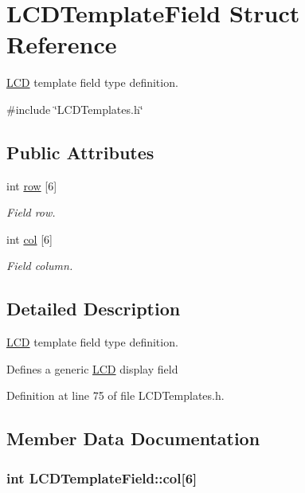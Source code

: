\hypertarget{struct_l_c_d_template_field}{\section{L\-C\-D\-Template\-Field Struct Reference}
\label{struct_l_c_d_template_field}
}


\hyperlink{class_l_c_d}{L\-C\-D} template field type definition.  




{\ttfamily \#include \char`\"{}L\-C\-D\-Templates.\-h\char`\"{}}

\subsection*{Public Attributes}
\begin{DoxyCompactItemize}
\item 
int \hyperlink{struct_l_c_d_template_field_a8c1f20c4249d9b0e338609e89499216e}{row} \mbox{[}6\mbox{]}
\begin{DoxyCompactList}\small\item\em Field row. \end{DoxyCompactList}\item 
int \hyperlink{struct_l_c_d_template_field_acf04ebae1e6cd326e3b4237cb73bb23d}{col} \mbox{[}6\mbox{]}
\begin{DoxyCompactList}\small\item\em Field column. \end{DoxyCompactList}\end{DoxyCompactItemize}


\subsection{Detailed Description}
\hyperlink{class_l_c_d}{L\-C\-D} template field type definition. 

Defines a generic \hyperlink{class_l_c_d}{L\-C\-D} display field 

Definition at line 75 of file L\-C\-D\-Templates.\-h.



\subsection{Member Data Documentation}
\hypertarget{struct_l_c_d_template_field_acf04ebae1e6cd326e3b4237cb73bb23d}{
\subsubsection[{col}]{\setlength{\rightskip}{0pt plus 5cm}int L\-C\-D\-Template\-Field\-::col\mbox{[}6\mbox{]}}}\label{struct_l_c_d_template_field_acf04ebae1e6cd326e3b4237cb73bb23d}


